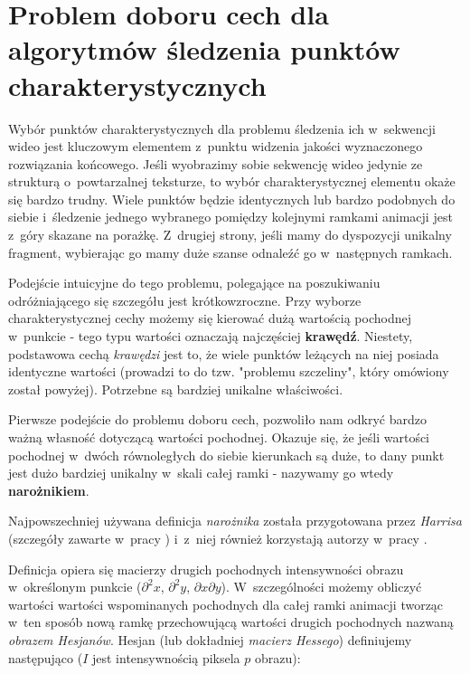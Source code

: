   \section{Problem doboru cech dla algorytmów śledzenia punktów charakterystycznych}\label{Section_GoodGeaturesToTrack}
    Wybór punktów charakterystycznych dla problemu śledzenia ich w~sekwencji wideo jest kluczowym elementem z~punktu widzenia jakości wyznaczonego rozwiązania końcowego. Jeśli wyobrazimy sobie sekwencję wideo jedynie ze strukturą o~powtarzalnej teksturze, to wybór charakterystycznej elementu okaże się bardzo trudny. Wiele punktów będzie identycznych lub bardzo podobnych do siebie i~śledzenie jednego wybranego pomiędzy kolejnymi ramkami animacji jest z~góry skazane na porażkę. Z~drugiej strony, jeśli mamy do dyspozycji unikalny fragment, wybierając go mamy duże szanse odnaleźć go w~następnych ramkach.

    Podejście intuicyjne do tego problemu, polegające na poszukiwaniu odróżniającego się szczegółu jest krótkowzroczne. Przy wyborze charakterystycznej cechy możemy się kierować dużą wartością pochodnej w~punkcie - tego typu wartości oznaczają najczęściej \textbf{krawędź}. Niestety, podstawowa cechą \textit{krawędzi} jest to, że wiele punktów leżących na niej posiada identyczne wartości (prowadzi to do tzw. "problemu szczeliny", który omówiony został powyżej). Potrzebne są bardziej unikalne właściwości.

    Pierwsze podejście do problemu doboru cech, pozwoliło nam odkryć bardzo ważną własność dotyczącą wartości pochodnej. Okazuje się, że jeśli wartości pochodnej w~dwóch równoległych do siebie kierunkach są duże, to dany punkt jest dużo bardziej unikalny w~skali całej ramki - nazywamy go wtedy \textbf{narożnikiem}.

    Najpowszechniej używana definicja \textit{narożnika} została przygotowana przez \textit{Harrisa} (szczegóły zawarte w~pracy \cite{Harris88}) i~z~niej również korzystają autorzy w~pracy \cite{GoodFeaturesToTrack94}.

    Definicja opiera się macierzy drugich pochodnych intensywności obrazu w~określonym punkcie ($\partial^2 x$, $\partial^2 y$, $\partial x\partial y$). W~szczególności możemy obliczyć wartości wartości wspominanych pochodnych dla całej ramki animacji tworząc w~ten sposób nową ramkę przechowującą wartości drugich pochodnych nazwaną \textit{obrazem Hesjanów}. Hesjan (lub dokładniej \textit{macierz Hessego}) definiujemy następująco ($I$ jest intensywnością piksela $p$ obrazu):

